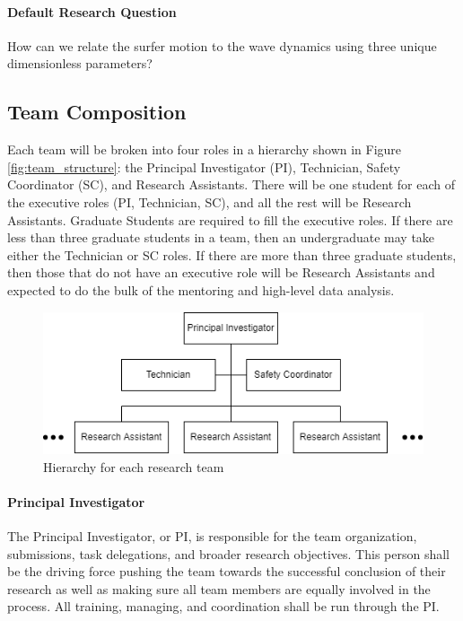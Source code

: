 \documentclass[
	letterpaper, %
	fontsize=10pt, %
	twoside=true, %
	numbers=noenddot, %
]{kaobook}
\begin{document}
\paragraph*{Default Research Question} How can we relate the surfer motion to the wave dynamics using three unique dimensionless parameters?

\subsection*{Team Composition} \label{ssec:team_comp}
Each team will be broken into four roles in a hierarchy shown in Figure \ref{fig:team_structure}: the Principal Investigator (PI), Technician, Safety Coordinator (SC), and Research Assistants.
There will be one student for each of the executive roles (PI, Technician, SC), and all the rest will be Research Assistants.
Graduate Students are required to fill the executive roles.
If there are less than three graduate students in a team, then an undergraduate may take either the Technician or SC roles.
If there are more than three graduate students, then those that do not have an executive role will be Research Assistants and expected to do the bulk of the mentoring and high-level data analysis.

\begin{figure}
    \caption{Hierarchy for each research team}
    \includegraphics[width=5.0in]{team_structure.png}
\end{figure}

\paragraph*{Principal Investigator} The Principal Investigator, or PI, is responsible for the team organization, submissions, task delegations, and broader research objectives.
This person shall be the driving force pushing the team towards the successful conclusion of their research as well as making sure all team members are equally involved in the process.
All training, managing, and coordination shall be run through the PI.
\end{document}
